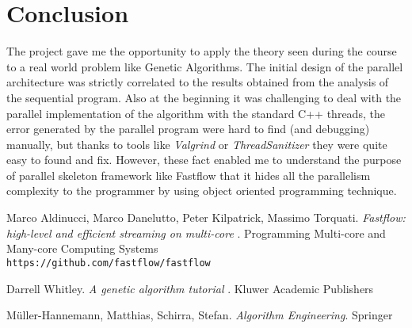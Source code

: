 \section{Conclusion}
The project gave me the opportunity to apply the theory seen during the course to a real world problem like Genetic Algorithms. The initial design of the parallel architecture was strictly correlated to the results obtained from the analysis of the sequential program. Also at the beginning it was challenging to deal with the parallel implementation of the algorithm with the standard C++ threads, the error generated by the parallel program were hard to find (and debugging) manually, but thanks to tools like \textit{Valgrind} or \textit{ThreadSanitizer} they were quite easy to found and fix. However, these fact enabled me to understand the purpose of parallel skeleton framework like Fastflow that it hides all the parallelism complexity to the programmer by using object oriented programming technique. 

\begin{thebibliography}{9}
	
	Marco Aldinucci, Marco Danelutto, Peter Kilpatrick, Massimo Torquati.
	\textit{Fastflow: high-level and efficient streaming on multi-core }. Programming Multi-core and Many-core Computing Systems
	\\\texttt{https://github.com/fastflow/fastflow}
	
	Darrell Whitley.
	\textit{A genetic algorithm tutorial }. Kluwer Academic Publishers
	
	Müller-Hannemann, Matthias, Schirra, Stefan.
	\textit{Algorithm Engineering}. Springer
	
	
\end{thebibliography} 